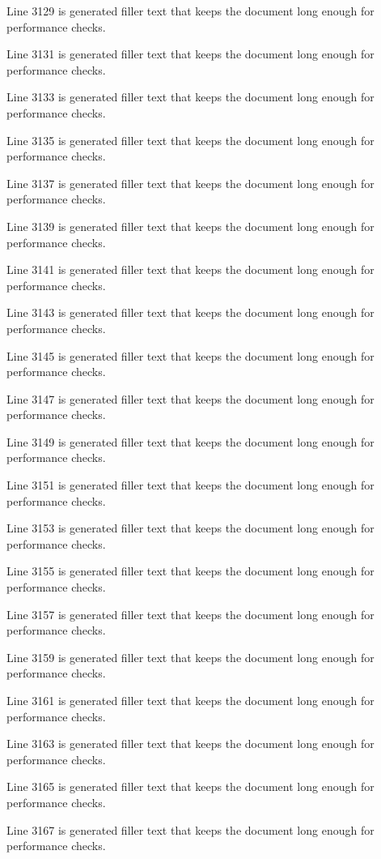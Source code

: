 Line 3129 is generated filler text that keeps the document long enough for performance checks.

Line 3131 is generated filler text that keeps the document long enough for performance checks.

Line 3133 is generated filler text that keeps the document long enough for performance checks.

Line 3135 is generated filler text that keeps the document long enough for performance checks.

Line 3137 is generated filler text that keeps the document long enough for performance checks.

Line 3139 is generated filler text that keeps the document long enough for performance checks.

Line 3141 is generated filler text that keeps the document long enough for performance checks.

Line 3143 is generated filler text that keeps the document long enough for performance checks.

Line 3145 is generated filler text that keeps the document long enough for performance checks.

Line 3147 is generated filler text that keeps the document long enough for performance checks.

Line 3149 is generated filler text that keeps the document long enough for performance checks.

Line 3151 is generated filler text that keeps the document long enough for performance checks.

Line 3153 is generated filler text that keeps the document long enough for performance checks.

Line 3155 is generated filler text that keeps the document long enough for performance checks.

Line 3157 is generated filler text that keeps the document long enough for performance checks.

Line 3159 is generated filler text that keeps the document long enough for performance checks.

Line 3161 is generated filler text that keeps the document long enough for performance checks.

Line 3163 is generated filler text that keeps the document long enough for performance checks.

Line 3165 is generated filler text that keeps the document long enough for performance checks.

Line 3167 is generated filler text that keeps the document long enough for performance checks.

